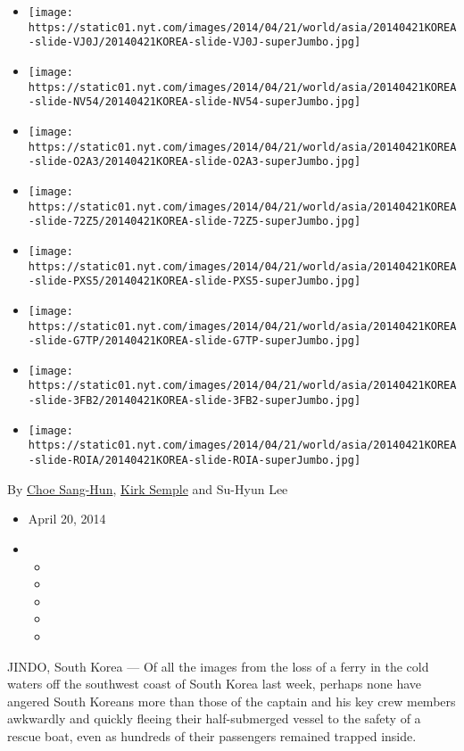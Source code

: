 \begin{itemize}
\item
  \texttt{[image: https://static01.nyt.com/images/2014/04/21/world/asia/20140421KOREA-slide-VJ0J/20140421KOREA-slide-VJ0J-superJumbo.jpg]}
\item
  \texttt{[image: https://static01.nyt.com/images/2014/04/21/world/asia/20140421KOREA-slide-NV54/20140421KOREA-slide-NV54-superJumbo.jpg]}
\item
  \texttt{[image: https://static01.nyt.com/images/2014/04/21/world/asia/20140421KOREA-slide-O2A3/20140421KOREA-slide-O2A3-superJumbo.jpg]}
\item
  \texttt{[image: https://static01.nyt.com/images/2014/04/21/world/asia/20140421KOREA-slide-72Z5/20140421KOREA-slide-72Z5-superJumbo.jpg]}
\item
  \texttt{[image: https://static01.nyt.com/images/2014/04/21/world/asia/20140421KOREA-slide-PXS5/20140421KOREA-slide-PXS5-superJumbo.jpg]}
\item
  \texttt{[image: https://static01.nyt.com/images/2014/04/21/world/asia/20140421KOREA-slide-G7TP/20140421KOREA-slide-G7TP-superJumbo.jpg]}
\item
  \texttt{[image: https://static01.nyt.com/images/2014/04/21/world/asia/20140421KOREA-slide-3FB2/20140421KOREA-slide-3FB2-superJumbo.jpg]}
\item
  \texttt{[image: https://static01.nyt.com/images/2014/04/21/world/asia/20140421KOREA-slide-ROIA/20140421KOREA-slide-ROIA-superJumbo.jpg]}
\end{itemize}

By \href{https://www.nytimes.com/by/choe-sang-hun}{Choe Sang-Hun},
\href{https://www.nytimes.com/by/kirk-semple}{Kirk Semple} and Su-Hyun
Lee

\begin{itemize}
\item
  April 20, 2014
\item
  \begin{itemize}
  \item
  \item
  \item
  \item
  \item
  \end{itemize}
\end{itemize}

JINDO, South Korea --- Of all the images from the loss of a ferry in the
cold waters off the southwest coast of South Korea last week, perhaps
none have angered South Koreans more than those of the captain and his
key crew members awkwardly and quickly fleeing their half-submerged
vessel to the safety of a rescue boat, even as hundreds of their
passengers remained trapped inside.

